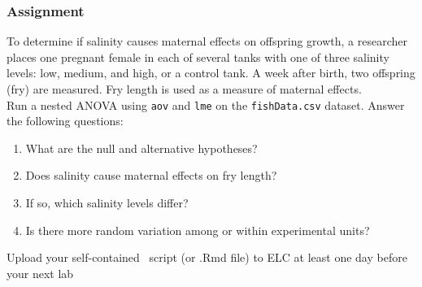 \documentclass[color=usenames,dvipsnames]{beamer}\usepackage[]{graphicx}\usepackage[]{color}
\newcommand{\inr}[1]{\colorbox{inlinecolor}{\texttt{#1}}}
\begin{document}
\begin{frame}[fragile]
  \frametitle{Assignment}
  \small
  To determine if salinity causes maternal effects on offspring
  growth, a researcher places one pregnant female in each of several
  tanks with one of three salinity levels: low, medium, and high, or a
  control tank. A week after birth, two offspring (fry) are
  measured. Fry length is used as a measure of maternal effects.\\
  \vfill
  Run a nested ANOVA using \inr{aov} and \inr{lme} on the
  {\tt fishData.csv} dataset. Answer the following questions:
\begin{enumerate}[\bf (1)]
  \item What are the null and alternative hypotheses?
  \item Does salinity cause maternal effects on fry length? 
  \item If so, which salinity levels differ?
  \item Is there more random variation among or within experimental units?
\end{enumerate}

\vfill
\centering
\normalsize
Upload your self-contained \R~script (or .Rmd file) to ELC at least
one day before your next lab \\
\end{frame}
\end{document}

